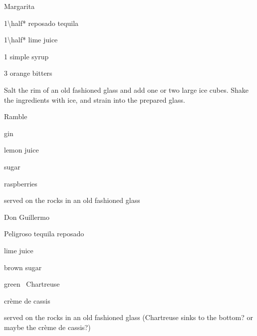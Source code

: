 \setcounter{AltCocktail}{1}
\newcommand\FNSymbolLogo[1][1]{\setcounter{AltCocktail}{#1}{\Large{\fnsymbol{AltCocktail}}}\setcounter{AltCocktail}{1}}
\newenvironment{AltCocktail}[2][1]
	{%
		\begin{Cocktail}[\Attribution{\FNSymbolLogo[#1]}]{#2}
	}
	{%
		\end{Cocktail}
	}
\begin{AltCocktail}{Margarita}
	\begin{Ingredients}
	\item \SI{1\half*}{\oz} reposado tequila
	\item \SI{1\half*}{\oz} lime juice
	\item \SI{1}{\oz} simple syrup
	\item 3 \si{\dashes} orange bitters
	\end{Ingredients}
	
	\begin{Instructions}
	Salt the rim of an old fashioned glass and add one or two large ice cubes.  Shake the ingredients with ice, and strain into the prepared glass.
	\end{Instructions}
\end{AltCocktail}

\newcommand\CommeCaLogo{\textit{\LARGE\raisebox{0.45ex}{c}\hspace{-0.27em}\c c}}
\newenvironment{CCCocktail}[1]
	{%
		\begin{Cocktail}[\Attribution{\CommeCaLogo}]{#1}
	}
	{%
		\end{Cocktail}
	}
\begin{CCCocktail}{Ramble}
	\begin{Ingredients}
	\item gin
	\item lemon juice
	\item sugar
	\item raspberries
	\end{Ingredients}
	
	\begin{Instructions}
	served on the rocks in an old fashioned glass
	\end{Instructions}
\end{CCCocktail}

\begin{CCCocktail}{Don Guillermo}
	\begin{Ingredients}
	\item Peligroso tequila reposado %
	\item lime juice
	\item brown sugar
	\item green \vep\ Chartreuse
	\item cr\`eme de cassis
	\end{Ingredients}
	
	\begin{Instructions}
	served on the rocks in an old fashioned glass (Chartreuse sinks to the bottom? or maybe the cr\`eme de cassis?)
	\end{Instructions}
\end{CCCocktail}

